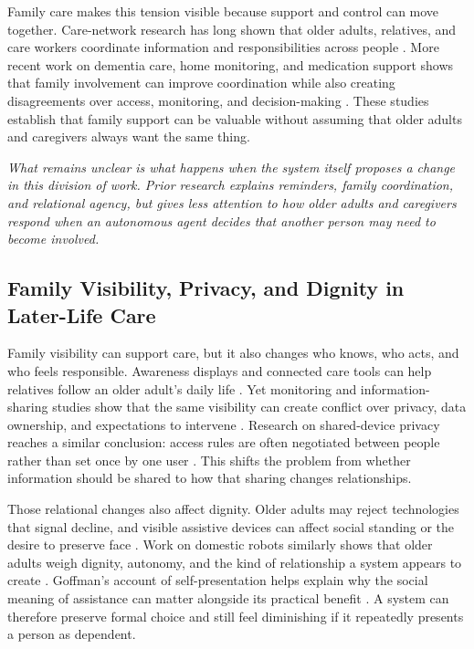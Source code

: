 Family care makes this tension visible because support and control can move together. Care-network research has long shown that older adults, relatives, and care workers coordinate information and responsibilities across people \cite{22,63,82,94,118}. More recent work on dementia care, home monitoring, and medication support shows that family involvement can improve coordination while also creating disagreements over access, monitoring, and decision-making \cite{24,36,73,76,81,115}. These studies establish that family support can be valuable without assuming that older adults and caregivers always want the same thing.

\textit{What remains unclear is what happens when the system itself proposes a change in this division of work. Prior research explains reminders, family coordination, and relational agency, but gives less attention to how older adults and caregivers respond when an autonomous agent decides that another person may need to become involved.}

\subsection{Family Visibility, Privacy, and Dignity in Later-Life Care}

Family visibility can support care, but it also changes who knows, who acts, and who feels responsible. Awareness displays and connected care tools can help relatives follow an older adult's daily life \cite{22,82,94,118}. Yet monitoring and information-sharing studies show that the same visibility can create conflict over privacy, data ownership, and expectations to intervene \cite{23,24,65,87,111,115}. Research on shared-device privacy reaches a similar conclusion: access rules are often negotiated between people rather than set once by one user \cite{50,122}. This shifts the problem from whether information should be shared to how that sharing changes relationships.

Those relational changes also affect dignity. Older adults may reject technologies that signal decline, and visible assistive devices can affect social standing or the desire to preserve face \cite{17,20,69,73}. Work on domestic robots similarly shows that older adults weigh dignity, autonomy, and the kind of relationship a system appears to create \cite{21}. Goffman's account of self-presentation helps explain why the social meaning of assistance can matter alongside its practical benefit \cite{34}. A system can therefore preserve formal choice and still feel diminishing if it repeatedly presents a person as dependent.

